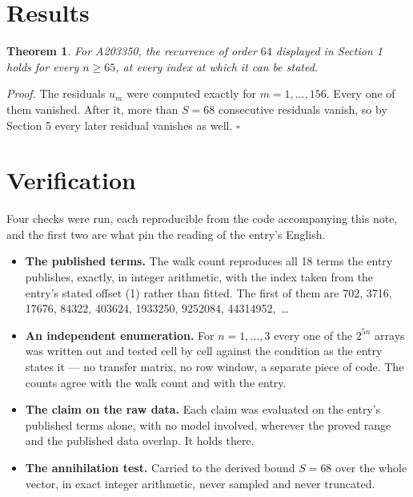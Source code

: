 \documentclass[11pt]{article}
\newtheorem{theorem}{Theorem}
\theoremstyle{definition}
\begin{document}
\section{Results}

\begin{theorem} For A203350, the recurrence of order $64$ displayed in Section 1 holds for every $n \ge 65$, at every index at which it can be stated.\end{theorem}

{\itshape Proof.} The residuals $u_m$ were computed exactly for $m = 1,\dots,156$. Every one of them vanished. After it, more than $S = 68$ consecutive residuals vanish, so by Section 5 every later residual vanishes as well. $\square$

\section{Verification}

Four checks were run, each reproducible from the code accompanying this note, and the first two are what pin the reading of the entry's English.

\begin{itemize}

\item {\bfseries The published terms.} The walk count reproduces all 18 terms the entry publishes, exactly, in integer arithmetic, with the index taken from the entry's stated offset (1) rather than fitted. The first of them are 702, 3716, 17676, 84322, 403624, 1933250, 9252084, 44314952,~\dots

\item {\bfseries An independent enumeration.} For $n = 1,\dots,3$ every one of the $2^{5n}$ arrays was written out and tested cell by cell against the condition as the entry states it --- no transfer matrix, no row window, a separate piece of code. The counts agree with the walk count and with the entry.

\item {\bfseries The claim on the raw data.} Each claim was evaluated on the entry's published terms alone, with no model involved, wherever the proved range and the published data overlap. It holds there.

\item {\bfseries The annihilation test.} Carried to the derived bound $S = 68$ over the whole vector, in exact integer arithmetic, never sampled and never truncated.

\end{itemize}
\end{document}
